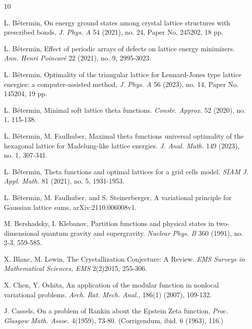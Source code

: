 \documentclass[reqno,english]{amsart}
\newtheorem{open problem}{Open Problem}[section]
\newtheorem{open question}{Open Question}[section]
\newtheorem{open questions on hexagonal lattice}{Open Questions on hexagonal lattice}[section]
\begin{document}
\begin{thebibliography}{10}


  L. B\'etermin, On energy ground states among crystal lattice structures with prescribed bonds,
 {\em J. Phys. A} 54 (2021), no. 24, Paper No. 245202, 18 pp.


 L. B\'etermin, Effect of periodic arrays of defects on lattice energy minimizers. {\em Ann. Henri Poincar\'e} 22 (2021), no. 9, 2995-3023.

  L. B\'etermin,
Optimality of the triangular lattice for Lennard-Jones type lattice
energies: a computer-assisted method, {\em J. Phys. A} 56 (2023), no. 14, Paper No. 145204, 19 pp.


  L. B\'etermin, Minimal soft lattice theta functions. {\em Constr. Approx.} 52 (2020), no. 1, 115-138.


 L. B\'etermin, M. Faulhuber, Maximal theta functions universal optimality of the hexagonal lattice for Madelung-like lattice energies. {\em J. Anal. Math.} 149 (2023), no. 1, 307-341.

 L. B\'etermin, Theta functions and optimal lattices for a grid cells model. {\em SIAM J. Appl. Math.} 81 (2021), no. 5, 1931-1953.

 L. B\'etermin, M. Faulhuber, and S. Steinerberger,
A variational principle for Gaussian lattice sums, arXiv:2110.006008v1.

M. Bershadsky, I. Klebanov, Partition functions and physical states in two-dimensional quantum gravity and supergravity.
 {\em Nuclear Phys. B} 360 (1991), no. 2-3, 559-585.

X. Blanc, M. Lewin, The Crystallization Conjecture: A Review. {\em EMS Surveys in Mathematical Sciences, EMS}  2(2)2015, 255-306.


X. Chen, Y. Oshita, An application of the modular function in nonlocal variational problems. {\em Arch.
Rat. Mech. Anal.}, 186(1) (2007), 109-132.

 J. Cassels,  On a problem of Rankin about the Epstein Zeta function, {\em Proc. Glasgow
Math. Assoc.} 4(1959), 73-80. (Corrigendum, ibid. 6 (1963), 116.)


\end{thebibliography}
\end{document}
